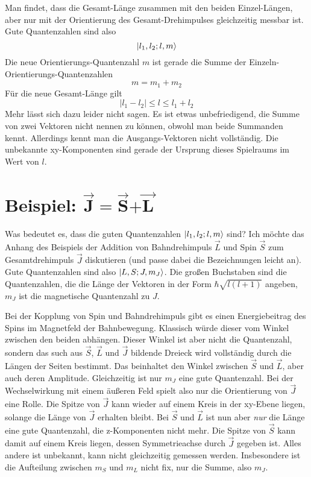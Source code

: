 Man findet, dass die Gesamt-Länge zusammen mit den beiden Einzel-Längen, aber nur mit der Orientierung des Gesamt-Drehimpulses gleichzeitig messbar ist. Gute Quantenzahlen sind also 
\begin{equation}
\ket{l_1, l_2; l , m }
\end{equation} 
Die neue Orientierungs-Quantenzahl $m$ ist gerade die Summe der Einzeln-Orientierungs-Quantenzahlen
\begin{equation}
 m  = m_1 + m_2
\end{equation}
Für die  neue Gesamt-Länge gilt
\begin{equation}
 | l_1 - l_2 | \le l \le l_1 + l_2
\end{equation}
Mehr lässt sich dazu leider nicht sagen. Es ist etwas unbefriedigend, die Summe von zwei Vektoren nicht nennen zu können, obwohl man beide Summanden kennt. Allerdings kennt man die Ausgangs-Vektoren nicht vollständig. Die unbekannte xy-Komponenten sind gerade der Ursprung dieses Spielraums im Wert von $l$.


\section{Beispiel: $\vec{\mathbf{J}} \mathbf{=} \vec{\mathbf{S}} \mathbf{+}  \vec{\mathbf{L}} $}

Was bedeutet es, dass die guten Quantenzahlen $\ket{l_1, l_2; l , m }$ sind? Ich möchte das Anhang des Beispiels der Addition von Bahndrehimpuls $\vec{L}$ und Spin $\vec{S}$ zum Gesamtdrehimpuls $\vec{J}$ diskutieren (und passe dabei die Bezeichnungen leicht an). Gute Quantenzahlen sind also $\ket{L, S; J , m_J }$. Die großen Buchstaben sind die Quantenzahlen, die die Länge der Vektoren in der Form $\hbar \sqrt{l (l+1)}$ angeben, $m_J$ ist die magnetische Quantenzahl zu $J$.


Bei der Kopplung von Spin und Bahndrehimpuls gibt es einen Energiebeitrag des Spins im Magnetfeld der Bahnbewegung. Klassisch würde dieser vom Winkel zwischen den beiden abhängen. Dieser Winkel ist aber nicht die Quantenzahl, sondern das such aus $\vec{S}$, $\vec{L}$ und $\vec{J}$ bildende Dreieck wird vollständig durch die Längen der Seiten bestimmt. Das beinhaltet den Winkel zwischen $\vec{S}$ und $\vec{L}$, aber auch deren Amplitude. Gleichzeitig ist nur $m_J$ eine gute Quantenzahl. Bei der Wechselwirkung mit einem äußeren Feld spielt also nur die Orientierung von $\vec{J}$ eine Rolle. Die Spitze von $\vec{J}$ kann wieder auf einem Kreis in der xy-Ebene liegen, solange die Länge von $\vec{J}$ erhalten bleibt. Bei $\vec{S}$ und $\vec{L}$ ist nun aber \emph{nur} die Länge eine gute Quantenzahl, die z-Komponenten nicht mehr. Die Spitze von $\vec{S}$ kann damit auf einem Kreis liegen, dessen Symmetrieachse durch $\vec{J}$ gegeben ist. Alles andere ist unbekannt, kann nicht gleichzeitig gemessen werden. Insbesondere ist die Aufteilung zwischen $m_S$ und $m_L$ nicht fix, nur die Summe, also $m_J$.

